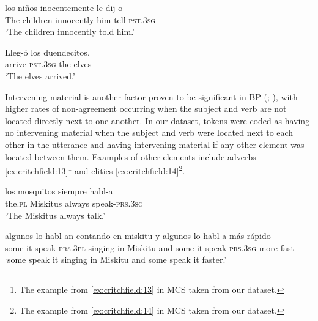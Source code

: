\documentclass[output=paper,colorlinks,citecolor=brown,
]{langscibook}
\begin{document}
\begin{exe} %
    \ex\label{ex:critchfield:11} 
            \gll los    niños      inocentemente le     dij-o\\  
           The  children  innocently       him  tell-\textsc{pst}.\textsc{3sg}\\
            \glt `The children innocently told him.'\\
\end{exe}

\begin{exe}
    \ex\label{ex:critchfield:12}
     \gll Lleg-ó                   los   duendecitos.\\
            arrive-\textsc{pst}.\textsc{3sg}   the   elves\\
            \glt  `The elves arrived.'\\
\end{exe}


Intervening material is another factor proven to be significant in BP (\citealt{naro2000variable}; \citealt{mendes2015variable}), with higher rates of non-agreement occurring when the subject and verb are not located directly next to one another. In our dataset, tokens were coded as having no intervening material when the subject and verb were located next to each other in the utterance and having intervening material if any other element was located between them. Examples of other elements include adverbs \ref{ex:critchfield:13}\footnote{The example from \ref{ex:critchfield:13} in MCS taken from our dataset.} and clitics \ref{ex:critchfield:14}\footnote{ The example from \ref{ex:critchfield:14} in MCS taken from our dataset.}.



\begin{exe} %
    \ex\label{ex:critchfield:13} 
            \gll los mosquitos siempre habl-a\\  
          the.\textsc{pl} Miskitus always speak-\textsc{prs}.\textsc{3sg}\\
            \glt `The Miskitus always talk.'\\
\end{exe}

\begin{exe}
    \ex\label{ex:critchfield:14}
     \gll algunos lo habl-an contando en miskitu y algunos lo habl-a     más rápido\\
     some    it  {speak-\textsc{prs}.\textsc{3pl}}  singing  in Miskitu and some it speak-\textsc{prs}.\textsc{3sg} more fast\\
            \glt  `some speak it singing in Miskitu and some speak it faster.'\\
\end{exe}
\end{document}
